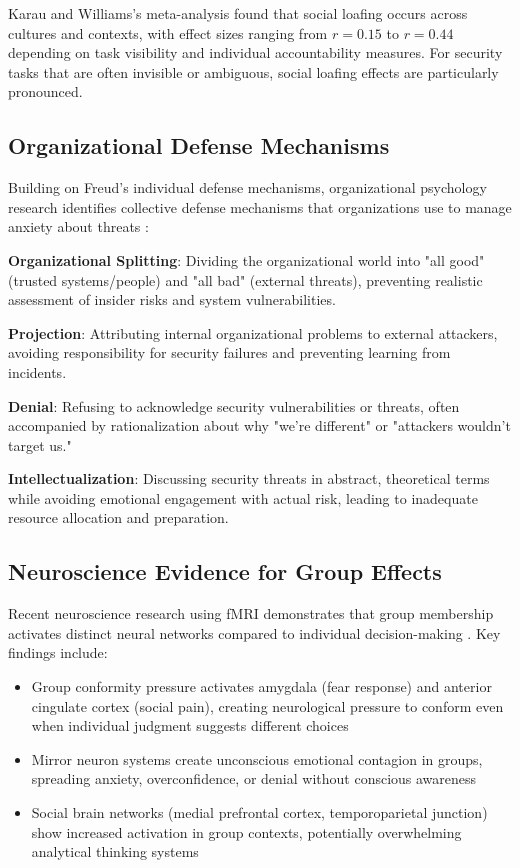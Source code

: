 \documentclass[11pt,a4paper]{article}
\begin{document}
Karau and Williams's meta-analysis \cite{karau1993} found that social loafing occurs across cultures and contexts, with effect sizes ranging from $r = 0.15$ to $r = 0.44$ depending on task visibility and individual accountability measures. For security tasks that are often invisible or ambiguous, social loafing effects are particularly pronounced.

\subsection{Organizational Defense Mechanisms}

Building on Freud's individual defense mechanisms, organizational psychology research identifies collective defense mechanisms that organizations use to manage anxiety about threats \cite{menzies1960}:

\textbf{Organizational Splitting}: Dividing the organizational world into "all good" (trusted systems/people) and "all bad" (external threats), preventing realistic assessment of insider risks and system vulnerabilities.

\textbf{Projection}: Attributing internal organizational problems to external attackers, avoiding responsibility for security failures and preventing learning from incidents.

\textbf{Denial}: Refusing to acknowledge security vulnerabilities or threats, often accompanied by rationalization about why "we're different" or "attackers wouldn't target us."

\textbf{Intellectualization}: Discussing security threats in abstract, theoretical terms while avoiding emotional engagement with actual risk, leading to inadequate resource allocation and preparation.

\subsection{Neuroscience Evidence for Group Effects}

Recent neuroscience research using fMRI demonstrates that group membership activates distinct neural networks compared to individual decision-making \cite{berns2005}. Key findings include:

\begin{itemize}
\item Group conformity pressure activates amygdala (fear response) and anterior cingulate cortex (social pain), creating neurological pressure to conform even when individual judgment suggests different choices
\item Mirror neuron systems create unconscious emotional contagion in groups, spreading anxiety, overconfidence, or denial without conscious awareness
\item Social brain networks (medial prefrontal cortex, temporoparietal junction) show increased activation in group contexts, potentially overwhelming analytical thinking systems
\end{itemize}
\end{document}
